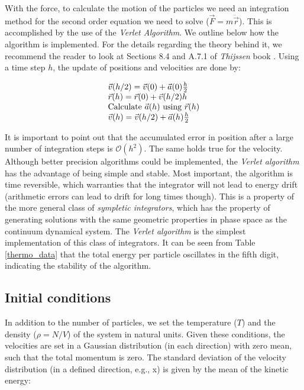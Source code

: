 \documentclass[aps,prl,reprint,groupedaddress]{revtex4-1}
\begin{document}
With the force, to calculate the motion of the particles we need an integration method for the second order equation we need to solve ($\vec{F} = m\ddot{\vec{r}}$). This is accomplished by the use of the \textit{Verlet Algorithm}. We outline below how the algorithm is implemented. For the details regarding the theory behind it, we recommend the reader to look at Sections 8.4 and A.7.1 of \textit{Thijssen} book \cite{ICCPBook}. Using a time step $h$, the update of positions and velocities are done by:

\begin{equation}
\begin{array}{l l}

\vec{v}(h/2) = \vec{v}(0) + \vec{a}(0)\frac{h}{2} \\
\vec{r}(h) = \vec{r}(0) + \vec{v}(h/2)h \\
\text{Calculate $\vec{a}(h)$ using $\vec{r}(h)$} \\
\vec{v}(h) = \vec{v}(h/2) + \vec{a}(h)\frac{h}{2}

\end{array}
\end{equation}

It is important to point out that the accumulated error in position after a large number of integration steps is $\mathcal{O}(h^2)$. The same holds true for the velocity. Although better precision algorithms could be implemented, the \textit{Verlet algorithm} has the advantage of being simple and stable. Most important, the algorithm is time reversible, which warranties that the integrator will not lead to energy drift (arithmetic errors can lead to drift for long times though). This is a property of the more general class of \textit{sympletic integrators}, which has the property of generating solutions with the same geometric properties in phase space as the continuum dynamical system. The \textit{Verlet algorithm} is the simplest implementation of this class of integrators. It can be seen from Table \ref{thermo_data} that the total energy per particle oscillates in the fifth digit, indicating the stability of the algorithm.

\subsection{Initial conditions}

In addition to the number of particles, we set the temperature ($T$) and the density ($\rho = N/V$) of the system in natural units. Given these conditions, the velocities are set in a Gaussian distribution (in each direction) with zero mean, such that the total momentum is zero. The standard deviation of the velocity distribution (in a defined direction, e.g., x) is given by the mean of the kinetic energy:
\end{document}
